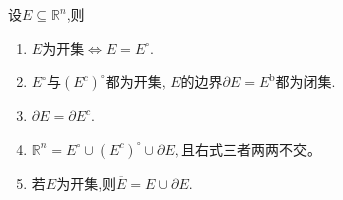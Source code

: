 \documentclass[../../main.tex]{subfiles}%
\begin{document}
\begin{theorem}\label{theorem:边界和开集基本性质}
设$E \subseteq \mathbb{R}^n$,则
\begin{enumerate}[(1)]
\item\label{theorem:边界和开集基本性质-1} $E$为开集$\iff E=E^\circ$.

\item\label{theorem:边界和开集基本性质-2} $E^\circ$与$(E^c)^\circ$都为开集, $E$的边界$\partial E = E^{\mathrm{b}}$都为闭集.

\item\label{theorem:边界和开集基本性质-3} $\partial E=\partial E^c.$

\item\label{theorem:边界和开集基本性质-4} $\mathbb{R} ^n=E^{\circ}\cup \left( E^c \right) ^{\circ}\cup \partial E,$且右式三者两两不交。

\item\label{theorem:边界和开集基本性质-5} 若$E$为开集,则$\overline{E}=E\cup \partial E$.
\end{enumerate}
\end{theorem}
\end{document}
